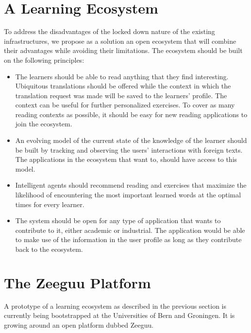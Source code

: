 \documentclass{sig-alternate-05-2015}
\begin{document}
\section {A Learning Ecosystem}

To address the disadvantages of the locked down nature of the existing infrastructures, we propose as a solution an open ecosystem that will combine their advantages while avoiding their limitations. The ecosystem should be built on the following principles:

\begin{itemize}

	\item The learners should be able to read anything that they find interesting. Ubiquitous translations should be offered while the context in which the translation request was made will be saved to the learners' profile. The context can be useful for further personalized exercises. To cover as many reading contexts as possible, it should be easy for new reading applications to join the ecosystem.

	\item An evolving model of the current state of the knowledge of the learner should be built by tracking and observing the users' interactions with foreign texts. The applications in the ecosystem that want to, should have access to this model.

	\item Intelligent agents should recommend reading and exercises that maximize the likelihood of encountering the most important learned words at the optimal times for every learner.

	\item The system should be open for any type of application that wants to contribute to it, either academic or industrial. The application would be able to make use of the information in the user profile as long as they contribute back to the ecosystem. 

\end{itemize}


\newpage
\section {The Zeeguu Platform}

A prototype of a learning ecosystem as described in the previous section is currently being bootstrapped at the Universities of Bern and Groningen. It is growing around an open platform dubbed Zeeguu. 
\end{document}
